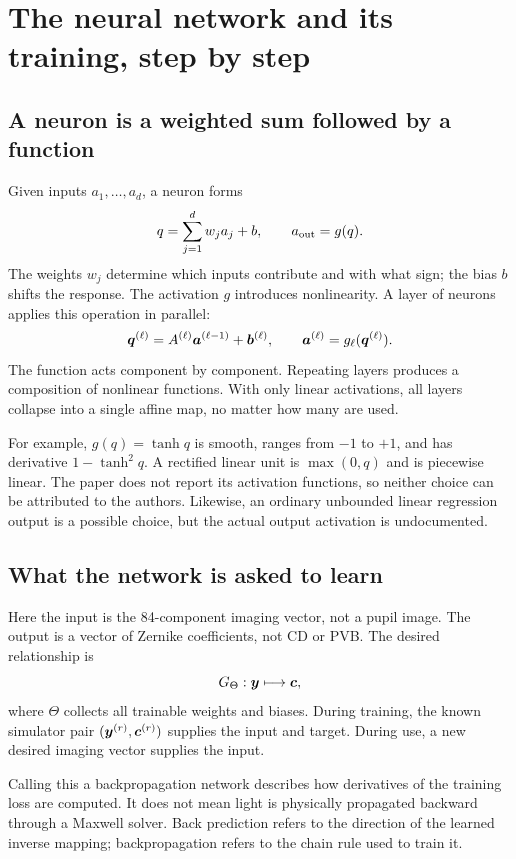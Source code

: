 \chapter{The neural network and its training, step by step}\label{ch:network}

\section{A neuron is a weighted sum followed by a function}
Given inputs $a_1,\ldots,a_d$, a neuron forms
\[
q=\sum_{j=1}^dw_ja_j+b,\qquad a_{\rm out}=g(q).
\]
The weights $w_j$ determine which inputs contribute and with what sign;
the bias $b$ shifts the response. The activation $g$ introduces nonlinearity.
A layer of neurons applies this operation in parallel:
\begin{equation}
\bm{q}^{(\ell)}=A^{(\ell)}\bm{a}^{(\ell-1)}+\bm{b}^{(\ell)},
\qquad
\bm{a}^{(\ell)}=g_\ell(\bm{q}^{(\ell)}).
\label{eq:network}
\end{equation}
The function acts component by component. Repeating layers produces a
composition of nonlinear functions. With only linear activations,
all layers collapse into a single affine map, no matter how many are used.

For example, $g(q)=\tanh q$ is smooth, ranges from $-1$ to $+1$,
and has derivative $1-\tanh^2q$. A rectified linear unit is
$\max(0,q)$ and is piecewise linear. The paper does not report its
activation functions, so neither choice can be attributed to the authors.
Likewise, an ordinary unbounded linear regression output is a possible
choice, but the actual output activation is undocumented.

\section{What the network is asked to learn}
Here the input is the 84-component imaging vector, not a pupil image.
The output is a vector of Zernike coefficients, not CD or PVB.
The desired relationship is
\[
G_\Theta:\bm{y}\longmapsto\bm{c},
\]
where $\Theta$ collects all trainable weights and biases.
During training, the known simulator pair
$(\bm{y}^{(r)},\bm{c}^{(r)})$ supplies the input and target.
During use, a new desired imaging vector supplies the input.

Calling this a backpropagation network describes how derivatives of the
training loss are computed. It does not mean light is physically
propagated backward through a Maxwell solver.
Back prediction refers to the direction of the learned inverse mapping;
backpropagation refers to the chain rule used to train it.


